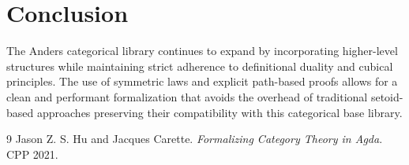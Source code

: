 \documentclass[11pt]{article}
\begin{document}
\newpage
\section{Conclusion}

The Anders categorical library continues to expand by incorporating higher-level structures while
maintaining strict adherence to definitional duality and cubical principles. The use of symmetric
laws and explicit path-based proofs allows for a clean and performant formalization that avoids
the overhead of traditional setoid-based approaches preserving their compatibility with this categorical base library.

\begin{thebibliography}{9}
Jason Z. S. Hu and Jacques Carette.
\textit{Formalizing Category Theory in Agda}.
CPP 2021.
\end{thebibliography}
\end{document}
